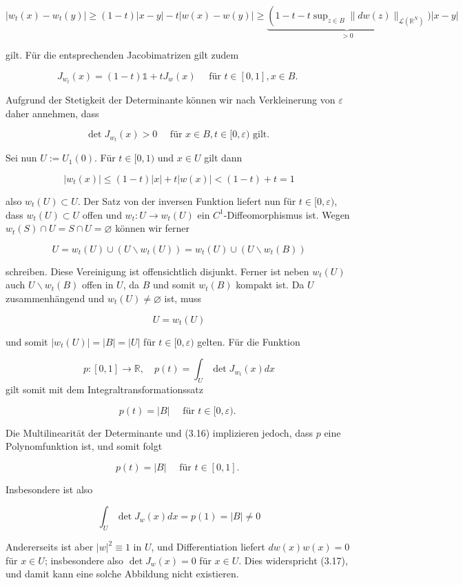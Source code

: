 \documentclass[10pt, letterpaper]{article}
\begin{document}
$\left|w_{t}(x)-w_{t}(y)\right| \geq(1-t)|x-y|-t|w(x)-w(y)| \geq \underbrace{\left(1-t-t \sup _{z \in B}\|d w(z)\|_{\mathcal{L}\left(\mathbb{R}^{N}\right)}\right.}_{>0})|x-y|$

gilt. Für die entsprechenden Jacobimatrizen gilt zudem

$$
J_{w_{t}}(x)=(1-t) \mathbb{1}+t J_{w}(x) \quad \text { für } t \in[0,1], x \in B \text {. }
$$

Aufgrund der Stetigkeit der Determinante können wir nach Verkleinerung von $\varepsilon$ daher annehmen, dass

$$
\operatorname{det} J_{w_{t}}(x)>0 \quad \text { für } x \in B, t \in[0, \varepsilon) \text { gilt. }
$$

Sei nun $U:=U_{1}(0)$. Für $t \in[0,1)$ und $x \in U$ gilt dann

$$
\left|w_{t}(x)\right| \leq(1-t)|x|+t|w(x)|<(1-t)+t=1
$$

also $w_{t}(U) \subset U$. Der Satz von der inversen Funktion liefert nun für $t \in[0, \varepsilon)$, dass $w_{t}(U) \subset U$ offen und $w_{t}: U \rightarrow w_{t}(U)$ ein $C^{1}$-Diffeomorphismus ist. Wegen $w_{t}(S) \cap U=S \cap U=\varnothing$ können wir ferner

$$
U=w_{t}(U) \cup\left(U \backslash w_{t}(U)\right)=w_{t}(U) \cup\left(U \backslash w_{t}(B)\right)
$$

schreiben. Diese Vereinigung ist offensichtlich disjunkt. Ferner ist neben $w_{t}(U)$ auch $U \backslash w_{t}(B)$ offen in $U$, da $B$ und somit $w_{t}(B)$ kompakt ist. Da $U$ zusammenhängend und $w_{t}(U) \neq \varnothing$ ist, muss

$$
U=w_{t}(U)
$$

und somit $\left|w_{t}(U)\right|=|B|=|U|$ für $t \in[0, \varepsilon)$ gelten. Für die Funktion

$$
p:[0,1] \rightarrow \mathbb{R}, \quad p(t)=\int_{U} \operatorname{det} J_{w_{t}}(x) d x
$$
gilt somit mit dem Integraltransformationssatz

$$
p(t)=|B| \quad \text { für } t \in[0, \varepsilon) \text {. }
$$

Die Multilinearität der Determinante und (3.16) implizieren jedoch, dass $p$ eine Polynomfunktion ist, und somit folgt

$$
p(t)=|B| \quad \text { für } t \in[0,1] \text {. }
$$

Insbesondere ist also

$$
\int_{U} \operatorname{det} J_{w}(x) d x=p(1)=|B| \neq 0
$$

Andererseits ist aber $|w|^{2} \equiv 1$ in $U$, und Differentiation liefert $d w(x) w(x)=0$ für $x \in U$; insbesondere also $\operatorname{det} J_{w}(x)=0$ für $x \in U$. Dies widerspricht (3.17), und damit kann eine solche Abbildung nicht existieren.
\end{document}
